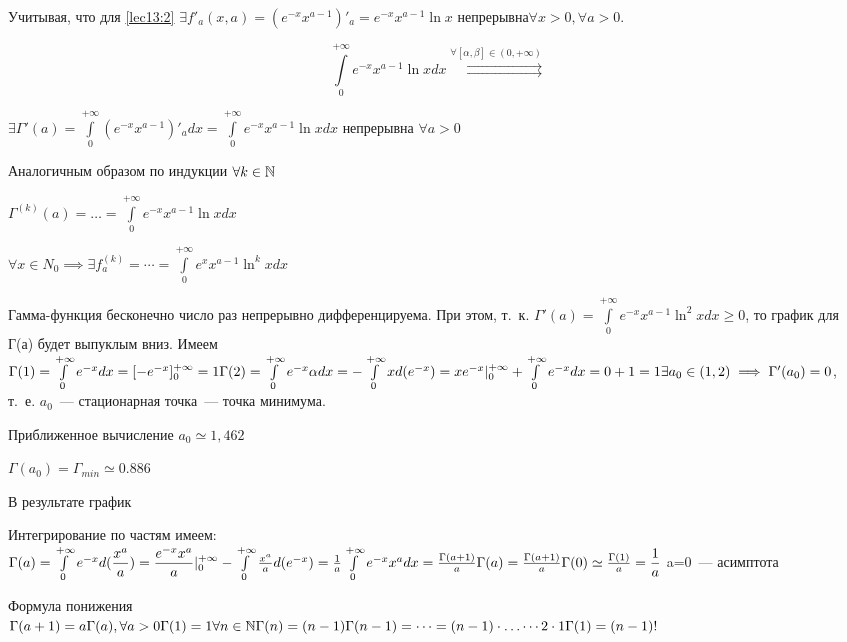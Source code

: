 \documentclass[../../main.tex]{subfiles}
\begin{document}
Учитывая, что для \eqref{lec13:2}
$
\exists f'_a(x, a) = (e^{-x} x^{a-1})'_a = e^{-x}x^{a-1} \ln x$ 
непрерывна$\forall x>0,\forall a >0.
$

\[
\int\limits_0^{+\infty} e^{-x} x^{a-1} \ln x dx
\overset{\forall \left[ \alpha, \beta \right] \in (0, 
	+\infty)}{\rightrightarrows}
\]

$
\exists \Gamma'(a) = \int\limits_0^{+\infty} (e^{-x} x^{a-1})'_a dx = 
\int\limits_0^{+\infty} e^{-x} x^{a-1} \ln x dx 
$
непрерывна
$\forall a > 0$

Аналогичным образом по индукции $\forall k \in \mathbb{N}$

$
\Gamma^{(k)}(a) = \ldots = \int\limits_0^{+\infty} e^{-x} x^{a-1} \ln x dx 
$

$
\forall x \in N_0 \implies \exists f^{(k)}_a = \cdots = 
\int\limits_0^{+\infty} e^x x^{a-1} \ln^k x dx 
$

Гамма-функция бесконечно число раз непрерывно дифференцируема.
При этом, т.~к. $\Gamma'(a) = \int\limits_0^{+\infty} e^{-x} x^{a-1} \ln^2 x 
dx \ge 
0$,
то график для Г(а) будет выпуклым вниз. Имеем
$
\Gamma(1) = \int\limits_0^{+\infty} e^{-x} dx = [-e^{-x}]^{+\infty}_0 = 1
\\
\Gamma(2) = \int\limits_0^{+\infty} e^{-x} \alpha dx = 
- \int\limits_0^{+\infty} x d(e^{-x}) = 
xe^{-x}|^{+\infty}_0 + \int\limits_0^{+\infty} e^{-x} dx = 
0 + 1 = 1
\\
\exists a_0 \in (1, 2) \implies \Gamma'(a_0) = 0$, т.~е. $a_0$~--- 
стационарная 
точка~--- точка минимума.

Приближенное вычисление $a_0 \simeq 1,462$

$\Gamma(a_0) = \Gamma_{min} \simeq 0.886$

В результате график

Интегрирование по частям имеем:
$
\Gamma(a) = \int\limits_0^{+\infty} e^{-x} d(\dfrac{x^a}{a}) =
 \dfrac{e^{-x}x^a}{a} |^{+\infty}_0 - \int\limits_0^{+\infty} \frac{x^a}{a} 
 d(e^{-x}) = 
 \frac{1}{a} \int\limits_0^{+\infty} e^{-x} x^a dx = \frac{\Gamma(a+1)}{a}
\\
\Gamma(a) = \frac{\Gamma(a+1)}{a}
\\
\Gamma(0) \simeq \frac{\Gamma(1)}{a} = \dfrac{1}{a}
$
a=0~--- асимптота

Формула понижения
\\
$
\Gamma(a+1) = a\Gamma(a), \forall a > 0
\\
\Gamma(1) = 1
\\
\forall n \in \mathbb{N}
\\
\Gamma(n) = (n-1)\Gamma(n-1) = \cdots = (n-1) \cdot \ldots \cdots 2 \cdot 1 
\Gamma(1) = (n-1)!
$
\end{document}

